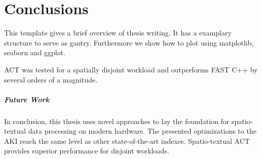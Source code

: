 \chapter{Conclusions}\label{c:c}

This template gives a brief overview of thesis writing. It has a examplary structure to serve as gantry.
Furthermore we show how to plot using matplotlib, seaborn and ggplot.

ACT was tested for a spatially disjoint workload and outperforms FAST C++ by several orders of a magnitude. 

\paragraph{Future Work}


In conclusion, this thesis uses novel approaches to lay the foundation for spatio-textual data processing on modern hardware. The presented optimizations to the AKI reach the same level as other state-of-the-art indexes. Spatio-textual ACT provides superior performance for disjoint workloads. 
